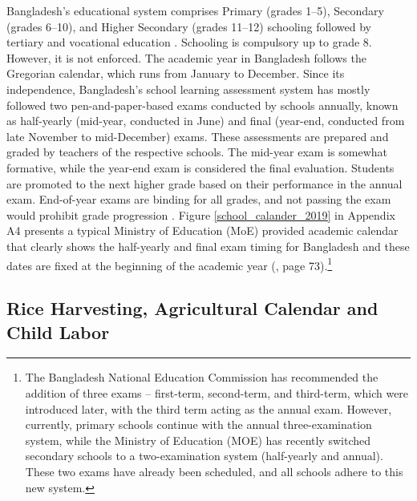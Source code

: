 \documentclass[12pt,letterpaper]{article}
\newcommand{\0}{\ensuremath{\mbox{\boldmath $0$}}}
\begin{document}
Bangladesh’s educational system comprises Primary (grades 1–5), Secondary (grades 6–10), and Higher Secondary (grades 11–12) schooling followed by tertiary and vocational education \citep{kono2018primary}. Schooling is compulsory up to grade 8. However, it is not enforced. The academic year in Bangladesh follows the Gregorian calendar, which runs from January to December. Since its independence, Bangladesh’s school learning assessment system has mostly followed two pen-and-paper-based exams conducted by schools annually, known as half-yearly (mid-year, conducted in June) and final (year-end, conducted from late November to mid-December) exams. These assessments are prepared and graded by teachers of the respective schools. The mid-year exam is somewhat formative, while the year-end exam is considered the final evaluation. Students are promoted to the next higher grade based on their performance in the annual exam. End-of-year exams are binding for all grades, and not passing the exam would prohibit grade progression \citep{de2004school,begum2008school,ADB2017}. Figure \ref{school_calander_2019} in Appendix A4 presents a typical Ministry of Education (MoE) provided academic calendar that clearly shows the half-yearly and final exam timing for Bangladesh and these dates are fixed at the beginning of the academic year (\cite{ADB2017}, page 73).\footnote{The Bangladesh National Education Commission has recommended the addition of three exams – first-term, second-term, and third-term, which were introduced later, with the third term acting as the annual exam. However, currently, primary schools continue with the annual three-examination system, while the Ministry of Education (MOE) has recently switched secondary schools to a two-examination system (half-yearly and annual). These two exams have already been scheduled, and all schools adhere to this new system.} 


\subsection{Rice Harvesting, Agricultural Calendar and Child Labor \label{sec.rice}}
\end{document}

